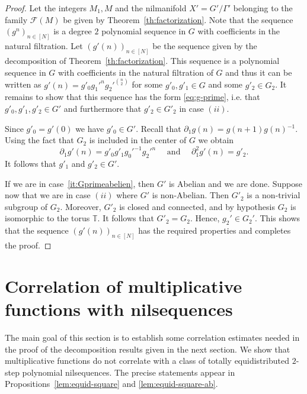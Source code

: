 \documentclass[11pt]{amsart}
\theoremstyle{definition}
\begin{document}
\begin{proof}
Let the integers $M_1, M$ and the nilmanifold  $X'=G'/\Gamma'$
belonging to the family ${{\mathcal F}}(M)$ be given
 by Theorem~\ref{th:factorization}. Note that the sequence
$(g^n)_{n\in [N]}$ is a degree $2$ polynomial sequence in $G$ with
coefficients in the natural filtration. Let $(g'(n))_{n\in [N]}$ be
the sequence given by the decomposition
  of Theorem~\ref{th:factorization}. This sequence is a polynomial sequence in $G$ with coefficients in the natural filtration of $G$ and thus it can be written as
 $g'(n)=g'_0g_1'^ng_2'^{\binom n2}$ for some $g'_0,g'_1\in G$ and some $g'_2\in G_2$.
It remains to show   that this sequence
 has the form \eqref{eq:g-prime}, i.e. that $g'_0,g'_1,g'_2\in G'$ and  furthermore that $g'_2\in G'_2$ in case $(ii)$.

Since $g'_0=g'(0)$ we have $g'_0\in G'$. Recall that $\partial_1g(n)=g(n+1)g(n){^{-1}}$.
 Using the fact that $G_2$ is included in the center of $G$ we obtain
 $$
\partial_1  g'(n)= g'_0 g'_1 g_0'^{-1} g_2'^n \quad \text{ and } \quad \partial_1^2 g'(n)=g'_2.
$$
It follows that $g'_1$ and $g'_2\in G'$.

If we are in   case~\eqref{it:Gprimeabelien}, then  $G'$ is Abelian
and we are done. Suppose now that we are in case $(ii)$ where  $G'$
is non-Abelian. Then $G'_2$ is a non-trivial subgroup of $G_2$.
Moreover, $G'_2$ is closed and connected, and by hypothesis $G_2$ is
isomorphic to the torus ${{\mathbb T}}$. It follows that $G'_2=G_2$. Hence,
$g_2'\in G_2'$. This shows that the sequence $(g'(n))_{n\in [N]}$
has the required properties and completes the proof.
  \end{proof}

\section{Correlation of multiplicative functions with
nilsequences}\label{S:CorrelationNil} The main goal of this section
is to establish some correlation estimates needed in the proof of
the decomposition results given in the next section. We show that
multiplicative functions do not correlate with a class of  totally
equidistributed $2$-step polynomial nilsequences. The precise
statements appear in Propositions~\ref{lem:equid-square} and
\ref{lem:equid-square-ab}.
\end{document}
